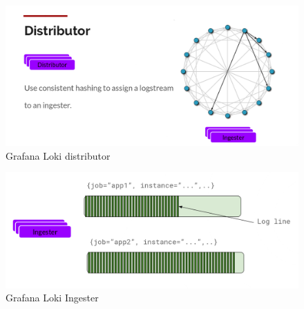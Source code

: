 \begin{figure}[ht]
    \includegraphics[scale=0.3]{img/loki_distributor}
    \caption[Grafana Loki distributor]{Grafana Loki distributor \cite{loki}}
\end{figure}

\begin{figure}[ht]
    \includegraphics[scale=0.3]{img/loki_ingester}
    \caption[Grafana Loki Ingester]{Grafana Loki Ingester \cite{loki}}
\end{figure}

